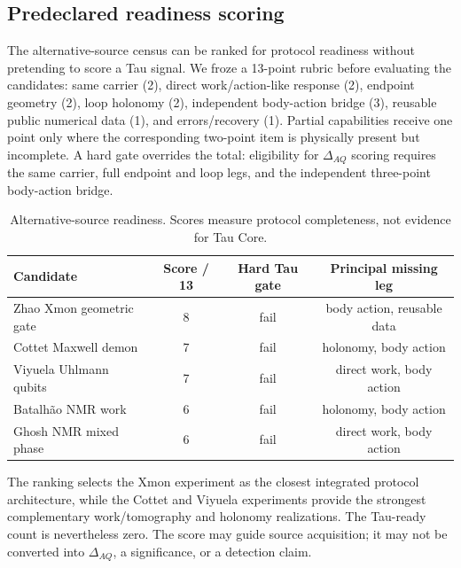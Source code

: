 \subsection{Predeclared readiness scoring}

The alternative-source census can be ranked for protocol readiness without
pretending to score a Tau signal. We froze a 13-point rubric before evaluating
the candidates: same carrier (2), direct work/action-like response (2),
endpoint geometry (2), loop holonomy (2), independent body-action bridge (3),
reusable public numerical data (1), and errors/recovery (1). Partial
capabilities receive one point only where the corresponding two-point item is
physically present but incomplete. A hard gate overrides the total: eligibility
for $\Delta_{AQ}$ scoring requires the same carrier, full endpoint and loop
legs, and the independent three-point body-action bridge.

\begin{table}[ht]
\centering
\small
\caption{Alternative-source readiness. Scores measure protocol completeness,
not evidence for Tau Core.}
\label{tab:alternative-readiness}
\begin{tabular}{@{}lccc@{}}
\toprule
Candidate & Score / 13 & Hard Tau gate & Principal missing leg\\
\midrule
Zhao Xmon geometric gate & 8 & fail & body action, reusable data\\
Cottet Maxwell demon & 7 & fail & holonomy, body action\\
Viyuela Uhlmann qubits & 7 & fail & direct work, body action\\
Batalh\~ao NMR work & 6 & fail & holonomy, body action\\
Ghosh NMR mixed phase & 6 & fail & direct work, body action\\
\bottomrule
\end{tabular}
\end{table}

The ranking selects the Xmon experiment as the closest integrated protocol
architecture, while the Cottet and Viyuela experiments provide the strongest
complementary work/tomography and holonomy realizations. The Tau-ready count
is nevertheless zero. The score may guide source acquisition; it may not be
converted into $\Delta_{AQ}$, a significance, or a detection claim.
